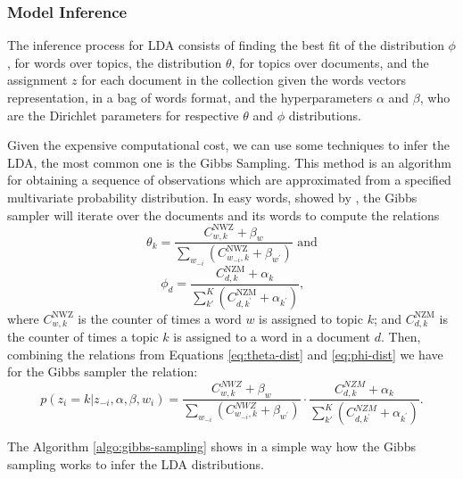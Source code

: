 	\subsubsection{Model Inference}

	The inference process for LDA consists of finding the best fit of the distribution $\phi$, for words over topics, the distribution $\theta$, for topics over documents, and the assignment $z$ for each document in the collection given the words vectors representation, in a bag of words format, and the hyperparameters $\alpha$ and $\beta$, who are the Dirichlet parameters for respective $\theta$ and $\phi$ distributions.

	Given the expensive computational cost, we can use some techniques to infer the LDA, the most common one is the Gibbs Sampling. This method is an algorithm for obtaining a sequence of observations which are approximated from a specified multivariate probability distribution. In easy words, showed by , the Gibbs sampler will iterate over the documents and its words to compute the relations
	\begin{equation}
		\label{eq:theta-dist}
		\theta_{k} = \frac{C_{w,k}^{\text{NWZ}} + \beta_{w}} {\sum_{w_{-i}} \left(C_{w_{-i},k}^{\text{NWZ}}
    + \beta_{w^{'}} \right)} \text{ and}
	\end{equation}
	\begin{equation}
		\label{eq:phi-dist}
		\phi_{d} = \frac{C_{d,k}^{\text{NZM}} + \alpha_{k}} {\sum_{k'}^{K} \left(C_{d,k^{'}}^{\text{NZM}} + \alpha_{k^{'}} \right)} \text{,}
	\end{equation}
	where $C_{w,k}^{\text{NWZ}}$ is the counter of times a word $w$ is assigned to topic $k$; and $C_{d,k}^{\text{NZM}}$ is the counter of times a topic $k$ is assigned to a word in a document $d$. Then, combining the relations from Equations \ref{eq:theta-dist} and \ref{eq:phi-dist} we have for the Gibbs sampler the relation:
	\begin{equation}
		\label{eq:gibbs-sampler}
		p(z_{i}=k|z_{-i}, \alpha, \beta, w_{i}) = \frac{C_{w,k}^{NWZ} + \beta_{w}} {\sum_{w_{-i}} \left(C_{w_{-i},k}^{NWZ} + \beta_{w^{'}} \right)} \cdot \frac{C_{d,k}^{NZM} + \alpha_{k}} {\sum_{k'}^{K} \left(C_{d,k^{'}}^{NZM} + \alpha_{k^{'}} \right)}\text{.}
	\end{equation}

	The Algorithm \ref{algo:gibbs-sampling} shows in a simple way how the Gibbs sampling works to infer the LDA distributions.

